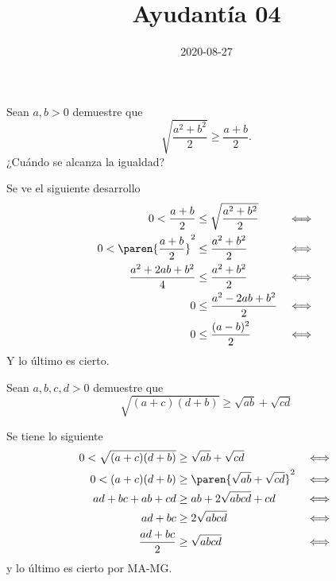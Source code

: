 \documentclass{ayudantia}
\title{Ayudantía 04}
\date{2020-08-27}
\begin{document}
\maketitle

\begin{prob}
    Sean \(a,b>0\) demuestre que
    \begin{equation*}
        \sqrt{\frac{a^2+b^2}2}\geq\frac{a+b}2.
    \end{equation*}
    ¿Cuándo se alcanza la igualdad?
\end{prob}

\begin{ans}
    \begin{sol}
        Se ve el siguiente desarrollo
        \begin{align*}
            0<\frac{a+b}2           & \leq\sqrt{\frac{a^2+b^2}2} & \iff \\
            0<\paren{\frac{a+b}2}^2 & \leq\frac{a^2+b^2}2        & \iff \\
            \frac{a^2+2ab+b^2}4     & \leq\frac{a^2+b^2}2        & \iff \\
            0                       & \leq\frac{a^2-2ab+b^2}2    & \iff \\
            0                       & \leq\frac{(a-b)^2}2        & \iff \\
        \end{align*}
        Y lo último es cierto.
    \end{sol}
\end{ans}


\begin{prob}
    Sean \(a,b,c,d>0\) demuestre que
    \begin{equation*}
        \sqrt{(a+c)(d+b)}\geq\sqrt{ab}+\sqrt{cd}
    \end{equation*}
\end{prob}

\begin{ans}
    \begin{sol}
        Se tiene lo siguiente
        \begin{align*}
            0<\sqrt{(a+c)(d+b)} & \geq\sqrt{ab}+\sqrt{cd}           & \iff \\
            0<(a+c)(d+b)        & \geq\paren{\sqrt{ab}+\sqrt{cd}}^2 & \iff \\
            ad+bc+ab+cd         & \geq ab+2\sqrt{abcd}+cd           & \iff \\
            ad+bc               & \geq2\sqrt{abcd}                  & \iff \\
            \frac{ad+bc}2       & \geq\sqrt{abcd}                   & \iff \\
        \end{align*}
        y lo último es cierto por MA-MG.
    \end{sol}
\end{ans}
\end{document}
